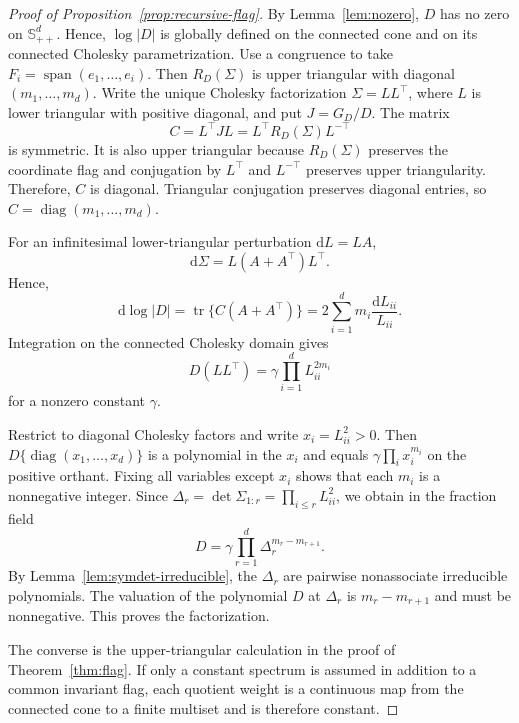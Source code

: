 \documentclass[12pt,a4paper]{article}
\theoremstyle{plain}
\theoremstyle{definition}
\newcommand{\Smat}{\mathbb{S}}
\newcommand{\tr}{\operatorname{tr}}
\newcommand{\Span}{\operatorname{span}}
\begin{document}
\begin{proof}[Proof of Proposition~\ref{prop:recursive-flag}]
    By Lemma~\ref{lem:nozero}, $D$ has no zero on $\Smat^d_{++}$.
    Hence, $\log|D|$ is globally defined on the connected cone and on its connected Cholesky parametrization.
    Use a congruence to take $F_i=\Span(e_1,\ldots,e_i)$.
    Then $R_D(\Sigma)$ is upper triangular with diagonal $(m_1,\ldots,m_d)$.
    Write the unique Cholesky factorization $\Sigma=LL^\top$, where $L$ is lower triangular with positive diagonal, and put $J=G_D/D$.
    The matrix
    \begin{equation*}
        C=L^\top JL=L^\top R_D(\Sigma)L^{-\top}
    \end{equation*}
    is symmetric.
    It is also upper triangular because $R_D(\Sigma)$ preserves the coordinate flag and conjugation by $L^\top$ and $L^{-\top}$ preserves upper triangularity.
    Therefore, $C$ is diagonal.
    Triangular conjugation preserves diagonal entries, so $C=\operatorname{diag}(m_1,\ldots,m_d)$.

    For an infinitesimal lower-triangular perturbation $\mathrm{d}L=LA$,
    \begin{equation*}
        \mathrm{d}\Sigma=L(A+A^\top)L^\top
        .
    \end{equation*}
    Hence,
    \begin{equation*}
        \mathrm{d}\log|D|
        =
        \tr\{C(A+A^\top)\}
        =
        2\sum_{i=1}^dm_i\frac{\mathrm{d}L_{ii}}{L_{ii}}
        .
    \end{equation*}
    Integration on the connected Cholesky domain gives
    \begin{equation*}
        D(LL^\top)=\gamma\prod_{i=1}^dL_{ii}^{2m_i}
    \end{equation*}
    for a nonzero constant $\gamma$.

    Restrict to diagonal Cholesky factors and write $x_i=L_{ii}^2>0$.
    Then $D\{\operatorname{diag}(x_1,\ldots,x_d)\}$ is a polynomial in the $x_i$ and equals $\gamma\prod_i x_i^{m_i}$ on the positive orthant.
    Fixing all variables except $x_i$ shows that each $m_i$ is a nonnegative integer.
    Since $\Delta_r=\det\Sigma_{1:r}=\prod_{i\le r}L_{ii}^2$, we obtain in the fraction field
    \begin{equation*}
        D=\gamma\prod_{r=1}^d\Delta_r^{m_r-m_{r+1}}
        .
    \end{equation*}
    By Lemma~\ref{lem:symdet-irreducible}, the $\Delta_r$ are pairwise nonassociate irreducible polynomials.
    The valuation of the polynomial $D$ at $\Delta_r$ is $m_r-m_{r+1}$ and must be nonnegative.
    This proves the factorization.

    The converse is the upper-triangular calculation in the proof of Theorem~\ref{thm:flag}.
    If only a constant spectrum is assumed in addition to a common invariant flag, each quotient weight is a continuous map from the connected cone to a finite multiset and is therefore constant.
\end{proof}
\end{document}
